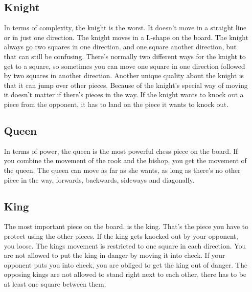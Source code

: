 \documentclass{article}
\begin{document}
\subsection*{Knight} In terms of complexity, the knight is the worst. It doesn’t move in a straight line or in just one direction. The knight moves in a L-shape on the board. The knight always go two squares in one direction, and one square another direction, but that can still be confusing. There’s normally two different ways for the knight to get to a square, so sometimes you can move one square in one direction followed by two squares in another direction. Another unique quality about the knight is that it can jump over other pieces. Because of the knight’s special way of moving it doesn’t matter if there’s pieces in the way. If the knight wants to knock out a piece from the opponent, it has to land on the piece it wants to knock out.

\subsection*{Queen} In terms of power, the queen is the most powerful chess piece on the board. If you combine the movement of the rook and the bishop, you get the movement of the queen. The queen can move as far as she wants, as long as there’s no other piece in the way, forwards, backwards, sideways and diagonally.

\subsection*{King} The most important piece on the board, is the king. That’s the piece you have to protect using the other pieces. If the king gets knocked out by your opponent, you loose. The kings movement is restricted to one square in each direction. You are not allowed to put the king in danger by moving it into check. If your opponent puts you into check, you are obliged to get the king out of danger. The opposing kings are not allowed to stand right next to each other, there has to be at least one square between them. 
\end{document}
